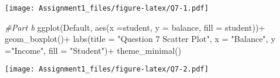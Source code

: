 \documentclass[
]{article}
\newenvironment{Shaded}{\begin{snugshade}}{\end{snugshade}}
\newcommand{\AttributeTok}[1]{\textcolor[rgb]{0.77,0.63,0.00}{#1}}
\newcommand{\CommentTok}[1]{\textcolor[rgb]{0.56,0.35,0.01}{\textit{#1}}}
\newcommand{\FunctionTok}[1]{\textcolor[rgb]{0.00,0.00,0.00}{#1}}
\newcommand{\NormalTok}[1]{#1}
\newcommand{\SpecialCharTok}[1]{\textcolor[rgb]{0.00,0.00,0.00}{#1}}
\newcommand{\StringTok}[1]{\textcolor[rgb]{0.31,0.60,0.02}{#1}}
\begin{document}
\texttt{[image: Assignment1\_files/figure-latex/Q7-1.pdf]}

\begin{Shaded}
\begin{Highlighting}[]
\CommentTok{\#Part b}
\FunctionTok{ggplot}\NormalTok{(Default, }\FunctionTok{aes}\NormalTok{(}\AttributeTok{x =}\NormalTok{student, }\AttributeTok{y =}\NormalTok{ balance, }\AttributeTok{fill =}\NormalTok{ student))}\SpecialCharTok{+}
  \FunctionTok{geom\_boxplot}\NormalTok{()}\SpecialCharTok{+}
  \FunctionTok{labs}\NormalTok{(}\AttributeTok{title =} \StringTok{"Question 7 Scatter Plot"}\NormalTok{, }\AttributeTok{x =} \StringTok{"Balance"}\NormalTok{, }\AttributeTok{y =}\StringTok{"Income"}\NormalTok{, }\AttributeTok{fill =} \StringTok{"Student"}\NormalTok{)}\SpecialCharTok{+}
  \FunctionTok{theme\_minimal}\NormalTok{()}
\end{Highlighting}
\end{Shaded}

\texttt{[image: Assignment1\_files/figure-latex/Q7-2.pdf]}
\end{document}
